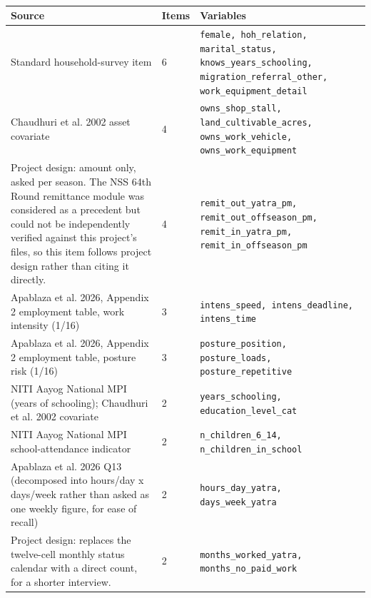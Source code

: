 \documentclass[9pt,a4paper,landscape]{article}
\begin{document}
\begin{longtable}{@{}p{0.5cm}p{3.3cm}p{1.7cm}p{7.3cm}p{5.6cm}p{5.4cm}@{}}
\bottomrule\end{longtable}\vspace{6pt}
\clearpage{}\\[4pt]
\begin{longtable}{@{}p{9.5cm}p{1.2cm}p{12.5cm}@{}}
\toprule \footnotesize\textbf{Source} & \footnotesize\textbf{Items} & \footnotesize\textbf{Variables}\\ \midrule
\endhead
\scriptsize Standard household-survey item & \scriptsize 6 & \scriptsize\texttt{female, hoh\_relation, marital\_status, knows\_years\_schooling, migration\_referral\_other, work\_equipment\_detail}\\
\scriptsize Chaudhuri et al. 2002 asset covariate & \scriptsize 4 & \scriptsize\texttt{owns\_shop\_stall, land\_cultivable\_acres, owns\_work\_vehicle, owns\_work\_equipment}\\
\scriptsize Project design: amount only, asked per season. The NSS 64th Round remittance module was considered as a precedent but could not be independently verified against this project's files, so this item follows project design rather than citing it directly. & \scriptsize 4 & \scriptsize\texttt{remit\_out\_yatra\_pm, remit\_out\_offseason\_pm, remit\_in\_yatra\_pm, remit\_in\_offseason\_pm}\\
\scriptsize Apablaza et al. 2026, Appendix 2 employment table, work intensity (1/16) & \scriptsize 3 & \scriptsize\texttt{intens\_speed, intens\_deadline, intens\_time}\\
\scriptsize Apablaza et al. 2026, Appendix 2 employment table, posture risk (1/16) & \scriptsize 3 & \scriptsize\texttt{posture\_position, posture\_loads, posture\_repetitive}\\
\scriptsize NITI Aayog National MPI (years of schooling); Chaudhuri et al. 2002 covariate & \scriptsize 2 & \scriptsize\texttt{years\_schooling, education\_level\_cat}\\
\scriptsize NITI Aayog National MPI school-attendance indicator & \scriptsize 2 & \scriptsize\texttt{n\_children\_6\_14, n\_children\_in\_school}\\
\scriptsize Apablaza et al. 2026 Q13 (decomposed into hours/day x days/week rather than asked as one weekly figure, for ease of recall) & \scriptsize 2 & \scriptsize\texttt{hours\_day\_yatra, days\_week\_yatra}\\
\scriptsize Project design: replaces the twelve-cell monthly status calendar with a direct count, for a shorter interview. & \scriptsize 2 & \scriptsize\texttt{months\_worked\_yatra, months\_no\_paid\_work}\\

\end{longtable}
\end{document}
